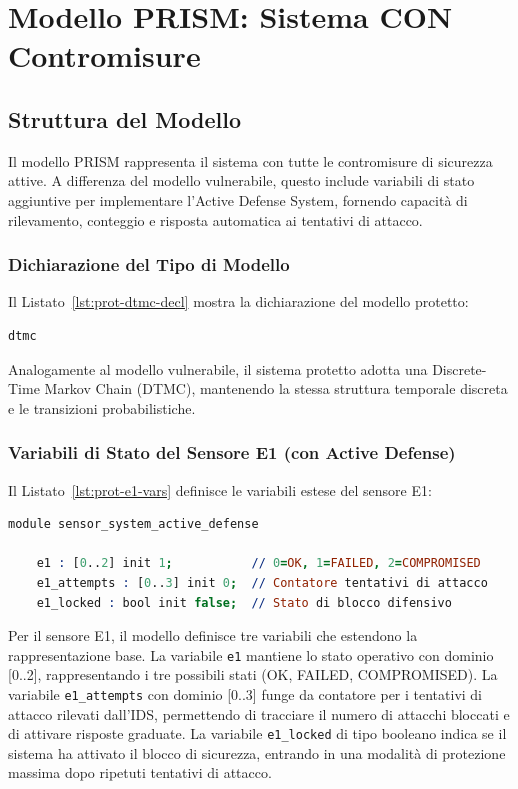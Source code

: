 \section{Modello PRISM: Sistema CON Contromisure}

\subsection{Struttura del Modello}
Il modello PRISM rappresenta il sistema con tutte le contromisure di sicurezza attive. A differenza del modello vulnerabile, questo include variabili di stato aggiuntive per implementare l'Active Defense System, fornendo capacità di rilevamento, conteggio e risposta automatica ai tentativi di attacco.

\subsubsection{Dichiarazione del Tipo di Modello}
Il Listato~\ref{lst:prot-dtmc-decl} mostra la dichiarazione del modello protetto:
\begin{lstlisting}[style=mystyle, language=Prolog, caption={Dichiarazione DTMC del modello protetto}, label=lst:prot-dtmc-decl]
dtmc
\end{lstlisting}
Analogamente al modello vulnerabile, il sistema protetto adotta una Discrete-Time Markov Chain (DTMC), mantenendo la stessa struttura temporale discreta e le transizioni probabilistiche.

\subsubsection{Variabili di Stato del Sensore E1 (con Active Defense)}
Il Listato~\ref{lst:prot-e1-vars} definisce le variabili estese del sensore E1:
\begin{lstlisting}[style=mystyle, language=Prolog, caption={Variabili di stato del sensore E1 con Active Defense}, label=lst:prot-e1-vars]
module sensor_system_active_defense
    
    e1 : [0..2] init 1;           // 0=OK, 1=FAILED, 2=COMPROMISED 
    e1_attempts : [0..3] init 0;  // Contatore tentativi di attacco
    e1_locked : bool init false;  // Stato di blocco difensivo
\end{lstlisting}
Per il sensore E1, il modello definisce tre variabili che estendono la rappresentazione base. La variabile \texttt{e1} mantiene lo stato operativo con dominio [0..2], rappresentando i tre possibili stati (OK, FAILED, COMPROMISED). La variabile \texttt{e1\_attempts} con dominio [0..3] funge da contatore per i tentativi di attacco rilevati dall'IDS, permettendo di tracciare il numero di attacchi bloccati e di attivare risposte graduate. La variabile \texttt{e1\_locked} di tipo booleano indica se il sistema ha attivato il blocco di sicurezza, entrando in una modalità di protezione massima dopo ripetuti tentativi di attacco.

